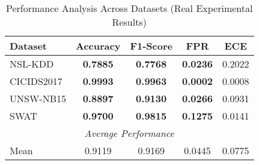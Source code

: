\begin{table}[t]
\centering
\caption{Performance Analysis Across Datasets (Real Experimental Results)}
\label{tab:calibration}
\begin{tabular}{@{}lcccc@{}}
\toprule
\textbf{Dataset} & \textbf{Accuracy} & \textbf{F1-Score} & \textbf{FPR} & \textbf{ECE} \\
\midrule
NSL-KDD & \textbf{0.7885} & \textbf{0.7768} & \textbf{0.0236} & 0.2022 \\
CICIDS2017 & \textbf{0.9993} & \textbf{0.9963} & \textbf{0.0002} & 0.0008 \\
UNSW-NB15 & \textbf{0.8897} & \textbf{0.9130} & \textbf{0.0266} & 0.0931 \\
SWAT & \textbf{0.9700} & \textbf{0.9815} & \textbf{0.1275} & 0.0141 \\
\midrule
\multicolumn{5}{c}{\textit{Average Performance}} \\
\midrule
Mean & 0.9119 & 0.9169 & 0.0445 & 0.0775 \\
\bottomrule
\end{tabular}
\end{table}
